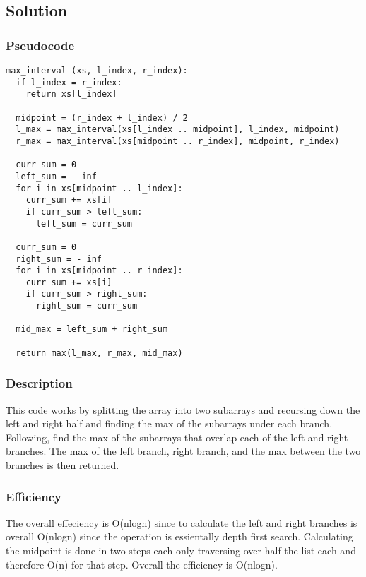 \subsection*{Solution}

\subsubsection*{Pseudocode}
\begin{verbatim}
max_interval (xs, l_index, r_index):
  if l_index = r_index:
    return xs[l_index]

  midpoint = (r_index + l_index) / 2
  l_max = max_interval(xs[l_index .. midpoint], l_index, midpoint)
  r_max = max_interval(xs[midpoint .. r_index], midpoint, r_index)

  curr_sum = 0
  left_sum = - inf
  for i in xs[midpoint .. l_index]:
    curr_sum += xs[i]
    if curr_sum > left_sum:
      left_sum = curr_sum

  curr_sum = 0
  right_sum = - inf
  for i in xs[midpoint .. r_index]:
    curr_sum += xs[i]
    if curr_sum > right_sum:
      right_sum = curr_sum

  mid_max = left_sum + right_sum

  return max(l_max, r_max, mid_max)
\end{verbatim}

\subsubsection*{Description}
This code works by splitting the array into two subarrays and recursing down the left and right half and finding the max of the subarrays under each branch. Following, find the max of the subarrays that overlap each of the left and right branches. The max of the left branch, right branch, and the max between the two branches is then returned.

\subsubsection*{Efficiency}
The overall effeciency is O(nlogn) since to calculate the left and right branches is overall O(nlogn) since the operation is essientally depth first search. Calculating the midpoint is done in two steps each only traversing over half the list each and therefore O(n) for that step. Overall the efficiency is O(nlogn).
